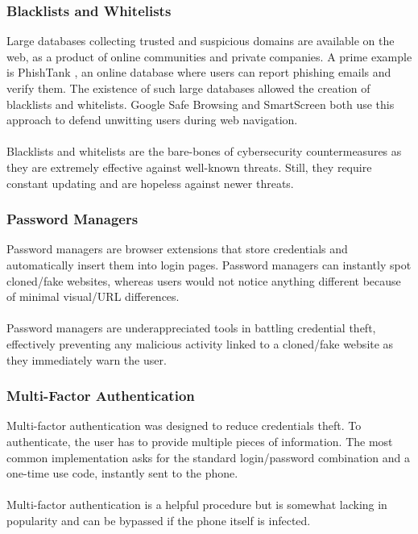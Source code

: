 \documentclass[a4paper]{article}
\begin{document}
\subsubsection{Blacklists and Whitelists}

Large databases collecting trusted and suspicious domains are available on the web, as a product of online communities and private companies. A prime example is PhishTank \cite{website-phishtank}, an online database where users can report phishing emails and verify them. The existence of such large databases allowed the creation of blacklists and whitelists. Google Safe Browsing and SmartScreen both use this approach to defend unwitting users during web navigation.
\\ \\
Blacklists and whitelists are the bare-bones of cybersecurity countermeasures as they are extremely effective against well-known threats. Still, they require constant updating and are hopeless against newer threats.

\subsubsection{Password Managers}

Password managers are browser extensions that store credentials and automatically insert them into login pages. Password managers can instantly spot cloned/fake websites, whereas users would not notice anything different because of minimal visual/URL differences.
\\ \\
Password managers are underappreciated tools in battling credential theft, effectively preventing any malicious activity linked to a cloned/fake website as they immediately warn the user.

\subsubsection{Multi-Factor Authentication}

Multi-factor authentication was designed to reduce credentials theft. To authenticate, the user has to provide multiple pieces of information. The most common implementation asks for the standard login/password combination and a one-time use code, instantly sent to the phone.
\\ \\
Multi-factor authentication is a helpful procedure but is somewhat lacking in popularity and can be bypassed if the phone itself is infected.
\end{document}
